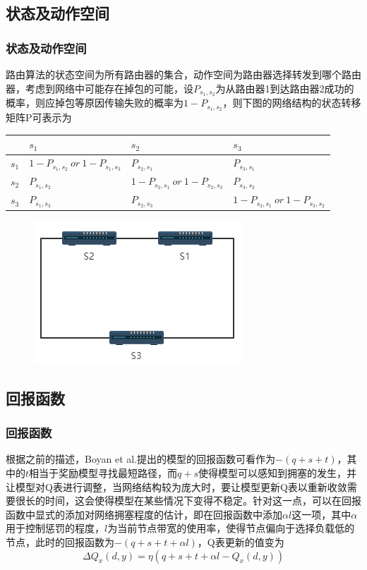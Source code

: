 \documentclass[hyperref={pdfpagelabels=false}]{beamer}
\begin{document}
\subsection{状态及动作空间}
\begin{frame}
	\frametitle{状态及动作空间}
	路由算法的状态空间为所有路由器的集合，动作空间为路由器选择转发到哪个路由器，考虑到网络中可能存在掉包的可能，设$P_{s_1,s_2}$为从路由器1到达路由器2成功的概率，则应掉包等原因传输失败的概率为$1-P_{s_1,s_2}$，则下图的网络结构的状态转移矩阵P可表示为

	\begin{table}[]\small
		\begin{tabular}{|l|l|l|l|}
		\hline
		      & $s_1$                             & $s_2$                              & $s_3$ \\ \hline
		$s_1$ & $1-P_{s_1,s_2}\ or\ 1 -P_{s_1,s_3}$  & $P_{s_2,s_1}$                      & $P_{s_3,s_1}$  \\ \hline
		$s_2$ & $P_{s_1,s_2}$                     & $1-P_{s_2,s_1}\ or\ 1-P_{s_2,s_3}$   & $P_{s_3,s_2}$  \\ \hline
		$s_3$ & $P_{s_1,s_3}$                     & $P_{s_2,s_3}$                      & $1-P_{s_3,s_1}\ or\ 1-P_{s_3,s_2}$  \\ \hline
		\end{tabular}
	\end{table}

	\begin{figure}
		\centering
		\includegraphics[width=.4\textwidth]{./figure/1.png}
	\end{figure}
\end{frame}



\subsection{回报函数}
\begin{frame}
	\frametitle{回报函数}
	根据之前的描述，Boyan et al.\cite{boyan1994packet}提出的模型的回报函数可看作为$-(q+s+t)$，其中的$t$相当于奖励模型寻找最短路径，而$q+s$使得模型可以感知到拥塞的发生，并让模型对Q表进行调整，当网络结构较为庞大时，要让模型更新Q表以重新收敛需要很长的时间，这会使得模型在某些情况下变得不稳定。针对这一点，可以在回报函数中显式的添加对网络拥塞程度的估计，即在回报函数中添加$\alpha l$这一项，其中$\alpha$用于控制惩罚的程度，$l$为当前节点带宽的使用率，使得节点偏向于选择负载低的节点，此时的回报函数为$-(q+s+t+\alpha l)$，Q表更新的值变为
	\[
		\Delta Q_{x}(d, y)=\eta(q+s+t+\alpha l-Q_{x}(d, y))
	\]
\end{frame}
\end{document}
